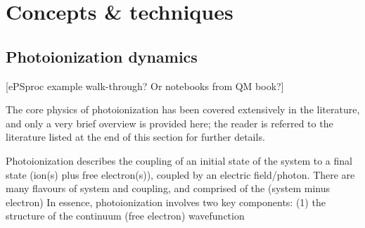 \section{Concepts \& techniques}

\subsection{Photoionization dynamics} 
[ePSproc example walk-through? Or notebooks from QM book?]

The core physics of photoionization has been covered extensively in the literature, and only a very brief overview is provided here; the reader is referred to the literature listed at the end of this section for further details.

Photoionization describes the coupling of an initial state of the system to a final state (ion(s) plus free electron(s)), coupled by an electric field/photon. There are many flavours of system and coupling, and 
comprised of the (system minus electron)  In essence, photoionization involves two key components: (1) the structure of the continuum (free electron) wavefunction 